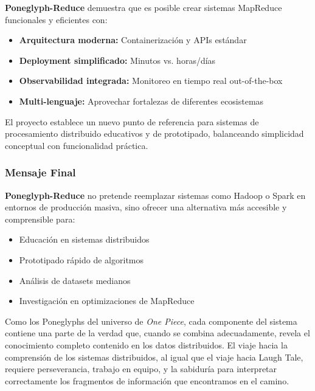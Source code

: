 \textbf{Poneglyph-Reduce} demuestra que es posible crear sistemas MapReduce funcionales y eficientes con:

\begin{itemize}
    \item \textbf{Arquitectura moderna:} Containerización y APIs estándar
    \item \textbf{Deployment simplificado:} Minutos vs. horas/días
    \item \textbf{Observabilidad integrada:} Monitoreo en tiempo real out-of-the-box
    \item \textbf{Multi-lenguaje:} Aprovechar fortalezas de diferentes ecosistemas
\end{itemize}

El proyecto establece un nuevo punto de referencia para sistemas de procesamiento distribuido educativos y de prototipado, balanceando simplicidad conceptual con funcionalidad práctica.

\subsubsection{Mensaje Final}

\textbf{Poneglyph-Reduce} no pretende reemplazar sistemas como Hadoop o Spark en entornos de producción masiva, sino ofrecer una alternativa más accesible y comprensible para:

\begin{itemize}
    \item Educación en sistemas distribuidos
    \item Prototipado rápido de algoritmos
    \item Análisis de datasets medianos
    \item Investigación en optimizaciones de MapReduce
\end{itemize}

Como los Poneglyphs del universo de \emph{One Piece}, cada componente del sistema contiene una parte de la verdad que, cuando se combina adecuadamente, revela el conocimiento completo contenido en los datos distribuidos. El viaje hacia la comprensión de los sistemas distribuidos, al igual que el viaje hacia Laugh Tale, requiere perseverancia, trabajo en equipo, y la sabiduría para interpretar correctamente los fragmentos de información que encontramos en el camino.
